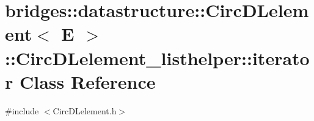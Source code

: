 \hypertarget{classbridges_1_1datastructure_1_1_circ_d_lelement_1_1_circ_d_lelement__listhelper_1_1iterator}{}\section{bridges\+:\+:datastructure\+:\+:Circ\+D\+Lelement$<$ E $>$\+:\+:Circ\+D\+Lelement\+\_\+listhelper\+:\+:iterator Class Reference}
\label{classbridges_1_1datastructure_1_1_circ_d_lelement_1_1_circ_d_lelement__listhelper_1_1iterator}


{\ttfamily \#include $<$Circ\+D\+Lelement.\+h$>$}

